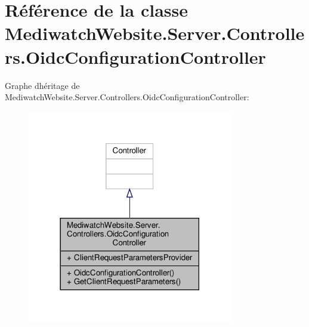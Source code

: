 \hypertarget{class_mediwatch_website_1_1_server_1_1_controllers_1_1_oidc_configuration_controller}{}\section{Référence de la classe Mediwatch\+Website.\+Server.\+Controllers.\+Oidc\+Configuration\+Controller}
\label{class_mediwatch_website_1_1_server_1_1_controllers_1_1_oidc_configuration_controller}


Graphe d\textquotesingle{}héritage de Mediwatch\+Website.\+Server.\+Controllers.\+Oidc\+Configuration\+Controller\+:\nopagebreak
\begin{figure}[H]
\begin{center}
\leavevmode
\includegraphics[width=254pt]{class_mediwatch_website_1_1_server_1_1_controllers_1_1_oidc_configuration_controller__inherit__graph}
\end{center}
\end{figure}


